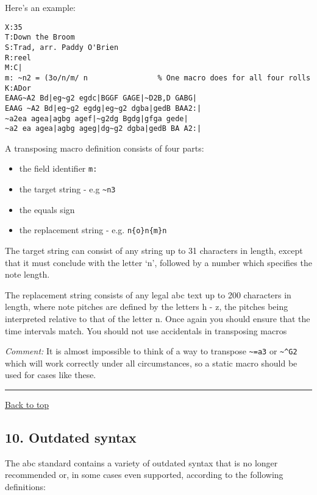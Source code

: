 Here's an example:

\begin{verbatim}
X:35
T:Down the Broom
S:Trad, arr. Paddy O'Brien
R:reel
M:C|
m: ~n2 = (3o/n/m/ n                % One macro does for all four rolls
K:ADor
EAAG~A2 Bd|eg~g2 egdc|BGGF GAGE|~D2B,D GABG|
EAAG ~A2 Bd|eg~g2 egdg|eg~g2 dgba|gedB BAA2:|
~a2ea agea|agbg agef|~g2dg Bgdg|gfga gede|
~a2 ea agea|agbg ageg|dg~g2 dgba|gedB BA A2:|
\end{verbatim}

A transposing macro definition consists of four parts:

\begin{itemize}
\item
  the field identifier \texttt{m:}
\item
  the target string - e.g \texttt{\textasciitilde{}n3}
\item
  the equals sign
\item
  the replacement string - e.g. \texttt{n\{o\}n\{m\}n}
\end{itemize}

The target string can consist of any string up to 31 characters in
length, except that it must conclude with the letter `n', followed by a
number which specifies the note length.

The replacement string consists of any legal abc text up to 200
characters in length, where note pitches are defined by the letters h -
z, the pitches being interpreted relative to that of the letter n. Once
again you should ensure that the time intervals match. You should not
use accidentals in transposing macros

\emph{Comment:} It is almost impossible to think of a way to transpose
\texttt{\textasciitilde{}=a3} or \texttt{\textasciitilde{}\^{}G2} which
will work correctly under all circumstances, so a static macro should be
used for cases like these.

\begin{center}\rule{0.5\linewidth}{\linethickness}\end{center}

\protect\hyperlink{}{Back to top}

\hypertarget{outdated_syntax}{\subsection{10. Outdated
syntax}\label{outdated_syntax}}

The abc standard contains a variety of outdated syntax that is no longer
recommended or, in some cases even supported, according to the following
definitions:

